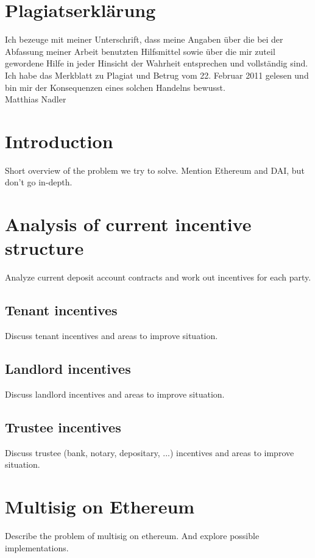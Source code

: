 \documentclass[12pt,a4paper,titlepage,oneside,english]{article}
\begin{document}
\section*{Plagiatserklärung}
Ich bezeuge mit meiner Unterschrift, dass meine Angaben über die bei der Abfassung meiner Arbeit benutzten Hilfsmittel sowie über die mir zuteil gewordene Hilfe in jeder Hinsicht der Wahrheit entsprechen und vollständig sind. Ich habe das Merkblatt zu Plagiat und Betrug vom 22. Februar 2011 gelesen und bin mir der Konsequenzen eines solchen Handelns bewusst.\\

Matthias Nadler

\newpage
\onehalfspacing
{}



\section{Introduction}
Short overview of the problem we try to solve. Mention Ethereum and DAI, but don't go in-depth.



\section{Analysis of current incentive structure}
Analyze current deposit account contracts and work out incentives for each party.
\subsection{Tenant incentives}
Discuss tenant incentives and areas to improve situation.
\subsection{Landlord incentives}
Discuss landlord incentives and areas to improve situation.
\subsection{Trustee incentives}
Discuss trustee (bank, notary, depositary, ...) incentives and areas to improve situation.



\section{Multisig on Ethereum}
Describe the problem of multisig on ethereum. And explore possible implementations.
\end{document}

